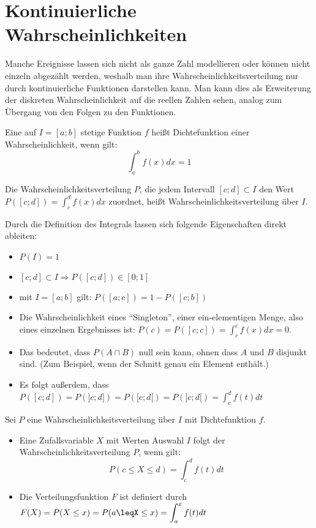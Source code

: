 \documentclass[../MAIN/main.tex]{subfiles}
\begin{document}
\section{Kontinuierliche Wahrscheinlichkeiten}
Manche Ereignisse lassen sich nicht als ganze Zahl modellieren oder können nicht einzeln abgezählt werden, weshalb man ihre Wahrscheinlichkeitsverteilung nur durch kontinuierliche Funktionen darstellen kann. Man kann dies als Erweiterung der diskreten Wahrscheinlichkeit auf die reellen Zahlen sehen, analog zum Übergang von den Folgen zu den Funktionen.
\begin{Definition}[- Dichtefunktion]
  Eine auf $I = [a;b]$ stetige Funktion $f$ heißt Dichtefunktion einer Wahrscheinlichkeit, wenn gilt:
  $$\int_{a}^{b} f(x)dx =1$$
\end{Definition}
\begin{Definition}
  Die Wahrscheinlichkeitsverteilung $P$, die jedem Intervall $[c;d] \subset I$ den Wert $P([c;d]) = \displaystyle \int_c^d f(x)dx$ zuordnet, heißt Wahrscheinlichkeitsverteilung über $I$.
\end{Definition}
\begin{Bemerkung}
  Durch die Definition des Integrals lassen sich folgende Eigenschaften direkt ableiten:
  \begin{itemize}
    \item $P(I)=1$
    \item $[c;d] \subset I \Rightarrow P([c;d])\in [0;1]$
    \item mit $I = [a;b]$ gilt: $P([a;c]) = 1- P([c;b])$
    \item Die Wahrscheinlichkeit eines ``Singleton'', einer ein-elementigen Menge, also eines einzelnen Ergebnisses ist:
    $P({c})=P([c;c])=\displaystyle\int_c^c f(x)dx =0$.
    \item Das bedeutet, dass $P(A \cap B)$ null sein kann, ohnen dass $A$ und $B$ disjunkt sind. (Zum Beispiel, wenn der Schnitt genau ein Element enthält.)
    \item Es folgt außerdem, dass $P([c;d])=P(]c;d])=P([c;d[)=P(]c;d[)=\displaystyle\int_c^d f(t)dt$
  \end{itemize}
\end{Bemerkung}
\begin{Definition}
  Sei $P$ eine Wahrscheinlichkeitsverteilung über $I$ mit Dichtefunktion $f$.\\
  \begin{itemize}
    \item Eine Zufallsvariable $X$ mit Werten Auswahl $I$ folgt der Wahrscheinlichkeitsverteilung $P$, wenn gilt: $$P(c\leq X \leq d)=\displaystyle \int_c^d f(t)dt$$
    \item Die Verteilungsfunktion $F$ ist definiert durch $F(X)=P(X\leq x)=P(a\leqX\leq x)=\displaystyle\int_a^x f(t)dt$
  \end{itemize}
\end{Definition}
\end{document}
